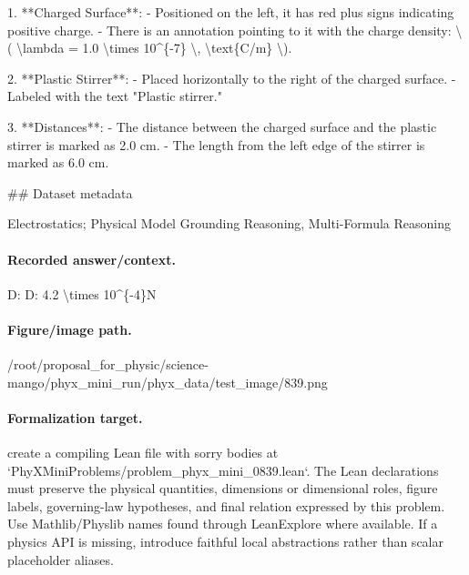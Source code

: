 1. **Charged Surface**: 
   - Positioned on the left, it has red plus signs indicating positive charge.
   - There is an annotation pointing to it with the charge density: \textbackslash{}( \textbackslash{}lambda = 1.0 \textbackslash{}times 10\textasciicircum{}\{-7\} \textbackslash{}, \textbackslash{}text\{C/m\} \textbackslash{}).
   
2. **Plastic Stirrer**:
   - Placed horizontally to the right of the charged surface.
   - Labeled with the text "Plastic stirrer."

3. **Distances**: 
   - The distance between the charged surface and the plastic stirrer is marked as 2.0 cm.
   - The length from the left edge of the stirrer is marked as 6.0 cm.

\#\# Dataset metadata

Electrostatics; Physical Model Grounding Reasoning, Multi-Formula Reasoning

\paragraph{Recorded answer/context.}
D: D: 4.2 \textbackslash{}times 10\textasciicircum{}\{-4\}N

\paragraph{Figure/image path.}
/root/proposal\_for\_physic/science-mango/phyx\_mini\_run/phyx\_data/test\_image/839.png

\paragraph{Formalization target.}
create a compiling Lean file with sorry bodies at `PhyXMiniProblems/problem\_phyx\_mini\_0839.lean`. The Lean declarations must preserve the physical quantities, dimensions or dimensional roles, figure labels, governing-law hypotheses, and final relation expressed by this problem.
Use Mathlib/Physlib names found through LeanExplore where available. If a physics API is missing, introduce faithful local abstractions rather than scalar placeholder aliases.

